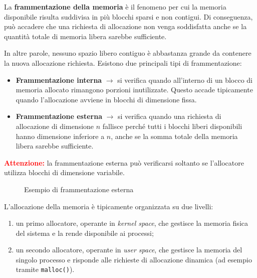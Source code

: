 La \textbf{frammentazione della memoria} è il fenomeno per cui la memoria disponibile risulta suddivisa in più blocchi sparsi e non contigui.  
Di conseguenza, può accadere che una richiesta di allocazione non venga soddisfatta anche se la quantità totale di memoria libera sarebbe sufficiente.

\medskip
\noindent In altre parole, nessuno spazio libero contiguo è abbastanza grande da contenere la nuova allocazione richiesta.
\noindent
Esistono due principali tipi di frammentazione:

\begin{itemize}
    \item \textbf{Frammentazione interna} $\rightarrow$ si verifica quando all'interno di un blocco di memoria allocato rimangono porzioni inutilizzate.  
    Questo accade tipicamente quando l'allocazione avviene in blocchi di dimensione fissa.

    \item \textbf{Frammentazione esterna} $\rightarrow$ si verifica quando una richiesta di allocazione di dimensione \(n\) fallisce perché tutti i blocchi liberi disponibili hanno dimensione inferiore a \(n\), anche se la somma totale della memoria libera sarebbe sufficiente.
\end{itemize}

\medskip

\noindent
\textbf{\textcolor{red}{Attenzione:}}  
la frammentazione esterna può verificarsi soltanto se l'allocatore utilizza blocchi di dimensione variabile.

\begin{figure}[H]
    \centering
    \caption{Esempio di frammentazione esterna}
\end{figure}

\medskip

\noindent L'allocazione della memoria è tipicamente organizzata su due livelli:

\begin{enumerate}
    \item un primo allocatore, operante in \textit{kernel space}, che gestisce la memoria fisica del sistema e la rende disponibile ai processi;

    \item un secondo allocatore, operante in \textit{user space}, che gestisce la memoria del singolo processo e risponde alle richieste di allocazione dinamica (ad esempio tramite \texttt{malloc()}).
\end{enumerate}
